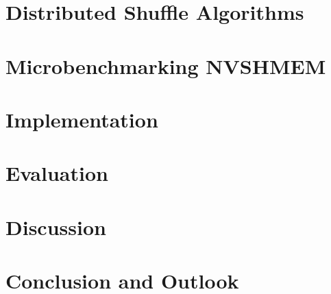\documentclass[
	english,
	ruledheaders=section,
	accentcolor=8c,
	type=intern,
	marginpar=false,
    logo=true,
	fontsize=10.5pt
	]{tudapub}
\begin{document}
\section{Distributed Shuffle Algorithms}\label{sec:shufflealgos}


\section{Microbenchmarking NVSHMEM}\label{sec:microbench}


\section{Implementation}\label{sec:impl}


\section{Evaluation}\label{sec:eval}


\section{Discussion}\label{sec:discuss}


\section{Conclusion and Outlook}\label{sec:conclusion}


\printbibliography
\end{document}
